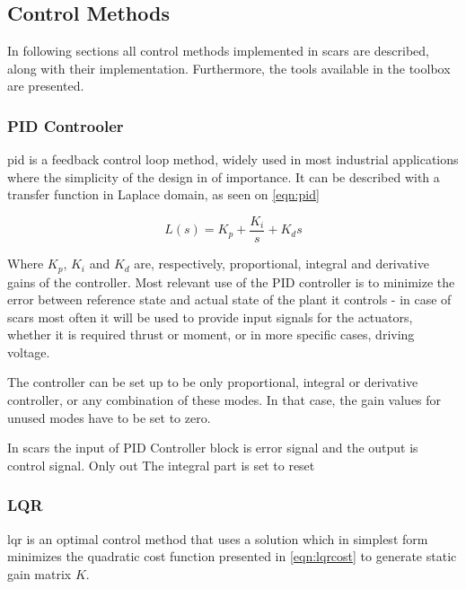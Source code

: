 \subsection{Control Methods}\label{sec:control}
    In following sections all control methods implemented in \ac{scars} are described, along with their implementation. Furthermore, the tools available in the toolbox are presented. 
    
    \subsubsection{PID Controoler}

        \ac{pid} is a feedback control loop method, widely used in most industrial applications where the simplicity of the design in of importance. It can be described with a transfer function in Laplace domain, as seen on \autoref{eqn:pid}
        
        \begin{equation}
            L(s) = K_p + \frac{K_i}{s} + K_d s
        \end{equation}\label{eqn:pid}

        Where $K_p$, $K_i$ and $K_d$ are, respectively, proportional, integral and derivative gains of the controller. Most relevant use of the PID controller is to minimize the error between reference state and actual state of the plant it controls - in case of \ac{scars} most often it will be used to provide input signals for the actuators, whether it is required thrust or moment, or in more specific cases, driving voltage.

        The controller can be set up to be only proportional, integral or derivative controller, or any combination of these modes. In that case, the gain values for unused modes have to be set to zero.

        In \ac{scars} the input of PID Controller block is error signal and the output is control signal. Only out The integral part is set to reset  
    
    \subsubsection{LQR}\label{sec:lqr}
        \ac{lqr} is an optimal control method that uses a solution which in simplest form minimizes the quadratic cost function presented in \autoref{eqn:lqrcost} to generate static gain matrix $K$.

